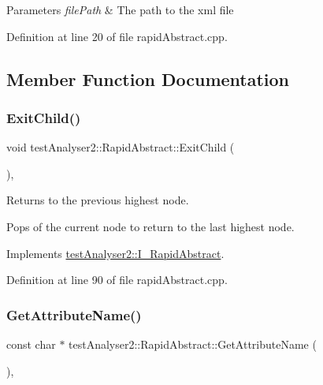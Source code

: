 \begin{DoxyParams}{Parameters}
{\em file\+Path} & The path to the xml file \\
\hline
\end{DoxyParams}


Definition at line 20 of file rapid\+Abstract.\+cpp.



\subsection{Member Function Documentation}
\mbox{\label{classtestAnalyser2_1_1RapidAbstract_a2288aec3d37a6c3802a1c7f6e76084b3}} 
\subsubsection{\texorpdfstring{ExitChild()}{ExitChild()}}
{\footnotesize\ttfamily void test\+Analyser2\+::\+Rapid\+Abstract\+::\+Exit\+Child (\begin{DoxyParamCaption}{ }\end{DoxyParamCaption})\hspace{0.3cm}{\ttfamily [override]}, {\ttfamily [virtual]}}



Returns to the previous highest node. 

Pops of the current node to return to the last highest node. 

Implements \mbox{\hyperlink{classtestAnalyser2_1_1I__RapidAbstract_af11701100809bb381f75ad683e95cf11}{test\+Analyser2\+::\+I\+\_\+\+Rapid\+Abstract}}.



Definition at line 90 of file rapid\+Abstract.\+cpp.

\mbox{\label{classtestAnalyser2_1_1RapidAbstract_aa7dd98c70db7f68528247a08717178ab}} 
\subsubsection{\texorpdfstring{GetAttributeName()}{GetAttributeName()}}
{\footnotesize\ttfamily const char $\ast$ test\+Analyser2\+::\+Rapid\+Abstract\+::\+Get\+Attribute\+Name (\begin{DoxyParamCaption}{ }\end{DoxyParamCaption})\hspace{0.3cm}{\ttfamily [override]}, {\ttfamily [virtual]}}



